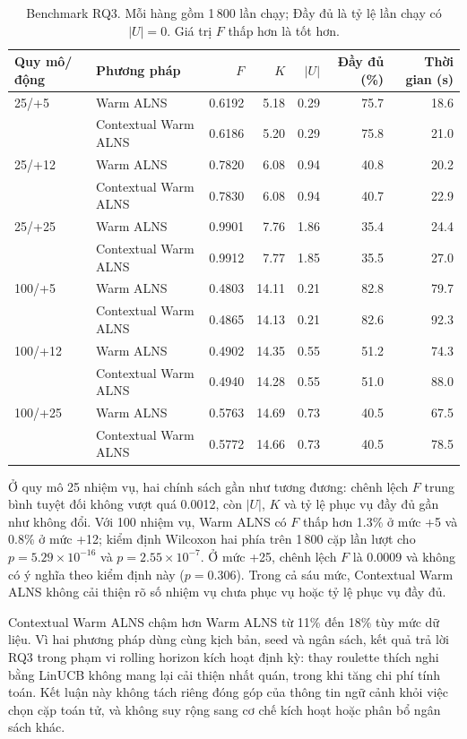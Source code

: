 \documentclass[11pt,a4paper]{article}
\begin{document}
\begin{table}[htbp]
\centering\scriptsize
\caption{Benchmark RQ3. Mỗi hàng gồm 1\,800 lần chạy; Đầy đủ là tỷ lệ lần chạy có $|U|=0$. Giá trị $F$ thấp hơn là tốt hơn.}
\begin{tabular}{@{}llrrrrr@{}}
\toprule
Quy mô/động & Phương pháp & $F$ & $K$ & $|U|$ & Đầy đủ (\%) & Thời gian (s)\\\midrule
25/+5 & Warm ALNS & 0.6192 & 5.18 & 0.29 & 75.7 & 18.6\\
& Contextual Warm ALNS & 0.6186 & 5.20 & 0.29 & 75.8 & 21.0\\
25/+12 & Warm ALNS & 0.7820 & 6.08 & 0.94 & 40.8 & 20.2\\
& Contextual Warm ALNS & 0.7830 & 6.08 & 0.94 & 40.7 & 22.9\\
25/+25 & Warm ALNS & 0.9901 & 7.76 & 1.86 & 35.4 & 24.4\\
& Contextual Warm ALNS & 0.9912 & 7.77 & 1.85 & 35.5 & 27.0\\
100/+5 & Warm ALNS & 0.4803 & 14.11 & 0.21 & 82.8 & 79.7\\
& Contextual Warm ALNS & 0.4865 & 14.13 & 0.21 & 82.6 & 92.3\\
100/+12 & Warm ALNS & 0.4902 & 14.35 & 0.55 & 51.2 & 74.3\\
& Contextual Warm ALNS & 0.4940 & 14.28 & 0.55 & 51.0 & 88.0\\
100/+25 & Warm ALNS & 0.5763 & 14.69 & 0.73 & 40.5 & 67.5\\
& Contextual Warm ALNS & 0.5772 & 14.66 & 0.73 & 40.5 & 78.5\\
\bottomrule
\end{tabular}
\label{tab:integrated-contextual}
\end{table}

Ở quy mô 25 nhiệm vụ, hai chính sách gần như tương đương: chênh lệch $F$ trung bình tuyệt đối không vượt quá 0.0012, còn $|U|$, $K$ và tỷ lệ phục vụ đầy đủ gần như không đổi. Với 100 nhiệm vụ, Warm ALNS có $F$ thấp hơn 1.3\% ở mức +5 và 0.8\% ở mức +12; kiểm định Wilcoxon hai phía trên 1\,800 cặp lần lượt cho $p=5.29\times10^{-16}$ và $p=2.55\times10^{-7}$. Ở mức +25, chênh lệch $F$ là 0.0009 và không có ý nghĩa theo kiểm định này ($p=0.306$). Trong cả sáu mức, Contextual Warm ALNS không cải thiện rõ số nhiệm vụ chưa phục vụ hoặc tỷ lệ phục vụ đầy đủ.

Contextual Warm ALNS chậm hơn Warm ALNS từ 11\% đến 18\% tùy mức dữ liệu. Vì hai phương pháp dùng cùng kịch bản, seed và ngân sách, kết quả trả lời RQ3 trong phạm vi rolling horizon kích hoạt định kỳ: thay roulette thích nghi bằng LinUCB không mang lại cải thiện nhất quán, trong khi tăng chi phí tính toán. Kết luận này không tách riêng đóng góp của thông tin ngữ cảnh khỏi việc chọn cặp toán tử, và không suy rộng sang cơ chế kích hoạt hoặc phân bổ ngân sách khác.
\end{document}
